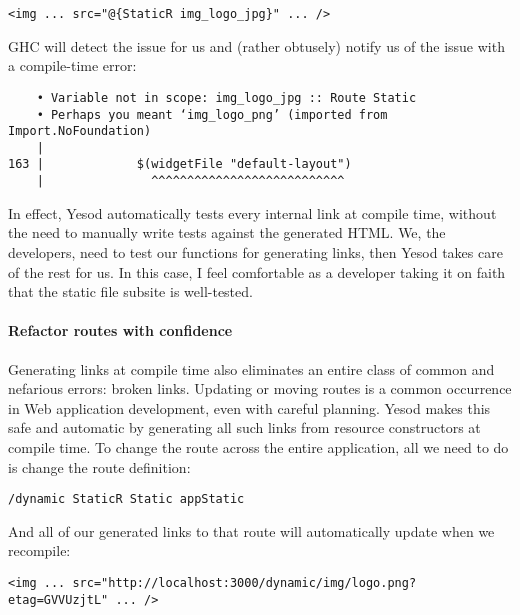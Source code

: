 \begin{Verbatim}
<img ... src="@{StaticR img_logo_jpg}" ... />
\end{Verbatim}

GHC will detect the issue for us and (rather obtusely) notify us of the issue with a compile-time error:

\begin{Verbatim}
    • Variable not in scope: img_logo_jpg :: Route Static
    • Perhaps you meant ‘img_logo_png’ (imported from Import.NoFoundation)
    |
163 |             $(widgetFile "default-layout")
    |               ^^^^^^^^^^^^^^^^^^^^^^^^^^^
\end{Verbatim}

In effect, Yesod automatically tests every internal link at compile time, without the need to manually write tests against the generated HTML. We, the developers, need to test our functions for generating links, then Yesod takes care of the rest for us. In this case, I feel comfortable as a developer taking it on faith that the static file subsite is well-tested.

\paragraph{Refactor routes with confidence} Generating links at compile time also eliminates an entire class of common and nefarious errors: broken links. Updating or moving routes is a common occurrence in Web application development, even with careful planning. Yesod makes this safe and automatic by generating all such links from resource constructors at compile time. To change the route across the entire application, all we need to do is change the route definition:

\begin{Verbatim}
/dynamic StaticR Static appStatic
\end{Verbatim}

And all of our generated links to that route will automatically update when we recompile:

\begin{Verbatim}
<img ... src="http://localhost:3000/dynamic/img/logo.png?etag=GVVUzjtL" ... />
\end{Verbatim}


